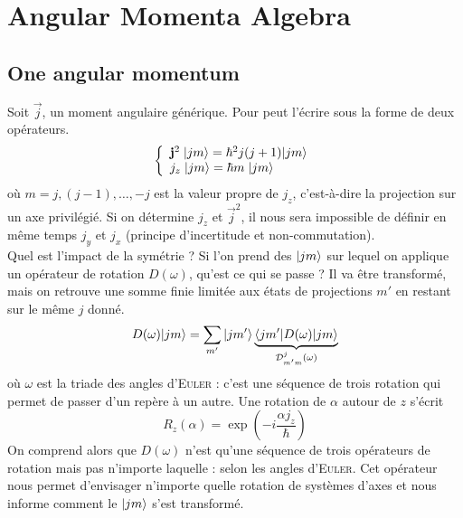 \chapter{Angular Momenta Algebra}
\section{One angular momentum}
Soit $\vec j$, un moment angulaire générique. Pour peut l'écrire sous la forme de deux 
opérateurs.
\begin{equation}
\left\{ \begin{array}{l}
{\bf j}^2 \; \vert j m \rangle  =  \hbar^2 j(j + 1) \vert j m \rangle \\
j_{z} \; \vert j m \rangle  =  \hbar m  \; \vert j m \rangle  
 \end{array} \right.
\end{equation}
où $m = j, (j-1), \ldots, -j $ est la valeur propre de $j_z$, c'est-à-dire la projection sur un axe privilégié.
Si on détermine $j_z$ et $\vec j^2$, il nous sera impossible de définir en même temps
$j_y$ et $j_x$ (principe d'incertitude et non-commutation).\\

Quel est l'impact de la symétrie ? Si l'on prend des $\ket{jm}$ sur lequel on applique un opérateur
de rotation $D(\omega)$, qu'est ce qui se passe ? 
Il va être transformé, mais on retrouve une somme finie limitée aux états de projections $m'$ en restant sur le même $j$ donné. 
\begin{equation}
D(\omega)  \vert j m \rangle  =  
\sum_{m'}
\vert j m' \rangle
\underbrace{
\langle jm' \vert  D(\omega) \vert j m \rangle}
_{ {\cal  D}^j_{m'm} (\omega) }
\end{equation}
où $\omega$ est la triade des angles d'\textsc{Euler} : c'est une séquence de trois rotation qui permet
 de passer d'un repère à un autre. Une rotation de $\alpha$ autour de $z$ s'écrit
\begin{equation}
R_z(\alpha) = \exp\left(-i\frac{\alpha j_z}{\hbar}\right)
\end{equation}
On comprend alors que $D(\omega)$ n'est qu'une séquence de trois opérateurs de rotation mais pas
n'importe laquelle : selon les angles d'\textsc{Euler}. Cet opérateur nous permet d'envisager 
n'importe quelle rotation de systèmes d'axes et nous informe comment le $\ket{jm}$ s'est 
transformé.\\

